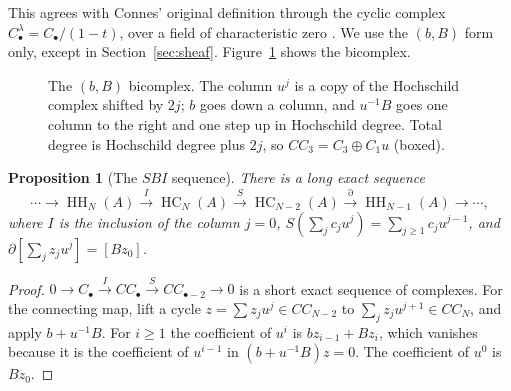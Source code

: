 \documentclass[11pt,oneside,reqno]{article}
\DeclareMathOperator{\HH}{HH}
\DeclareMathOperator{\HC}{HC}
\newcommand{\pa}{\partial}
\theoremstyle{plain}
\newtheorem{proposition}[theorem]{Proposition}
\theoremstyle{definition}
\theoremstyle{remark}
\begin{document}
This agrees with Connes' original definition through the cyclic complex
\(C^\lambda_\bullet=C_\bullet/(1-t)\), over a field of characteristic zero
\cite[\S2.1]{Loday}. We use the \((b,B)\) form only, except in
Section~\ref{sec:sheaf}. Figure~\ref{fig:bB} shows the bicomplex.

\begin{figure}[htbp]
\centering
{}
\caption[The \((b,B)\) bicomplex]{The \((b,B)\) bicomplex. The column
\(u^j\) is a copy of the Hochschild complex shifted by \(2j\); \(b\) goes down a
column, and \(u^{-1}B\) goes one column to the right and one step up in
Hochschild degree. Total degree is Hochschild degree plus \(2j\), so
\(CC_3=C_3\oplus C_1u\) (boxed).}
\label{fig:bB}
\end{figure}

\begin{proposition}[The \(SBI\) sequence]\label{prop:SBI}
There is a long exact sequence
\[
 \cdots\to\HH_N(A)\xrightarrow{I}\HC_N(A)\xrightarrow{S}\HC_{N-2}(A)
 \xrightarrow{\pa}\HH_{N-1}(A)\to\cdots,
\]
where \(I\) is the inclusion of the column \(j=0\), \(S(\sum_jc_ju^j)=
\sum_{j\ge1}c_ju^{j-1}\), and \(\pa[\sum_jz_ju^j]=[Bz_0]\).
\end{proposition}

\begin{proof}
\(0\to C_\bullet\xrightarrow{I}CC_\bullet\xrightarrow{S}CC_{\bullet-2}\to0\) is a
short exact sequence of complexes. For the connecting map, lift a cycle
\(z=\sum z_ju^j\in CC_{N-2}\) to \(\sum_jz_ju^{j+1}\in CC_N\), and apply
\(b+u^{-1}B\). For \(i\ge1\) the coefficient of \(u^i\) is \(bz_{i-1}+Bz_i\),
which vanishes because it is the coefficient of \(u^{i-1}\) in
\((b+u^{-1}B)z=0\). The coefficient of \(u^0\) is \(Bz_0\).
\end{proof}
\end{document}
